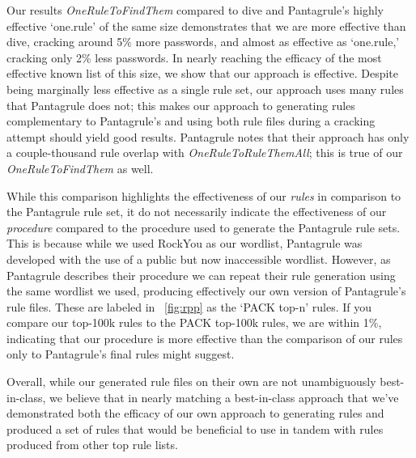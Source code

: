 \documentclass[letterpaper,twocolumn,10pt]{article}
\begin{document}
Our results \textit{OneRuleToFindThem} compared to dive and Pantagrule's highly
effective `one.rule' of the same size demonstrates that we are
more effective than dive, cracking around 5\% more passwords, and almost as effective
as `one.rule,' cracking only 2\% less passwords. In nearly reaching the efficacy of
the most effective known list of this size, we show that our approach is
effective. Despite being marginally less effective as a single rule set, our approach
uses many rules that Pantagrule does not; this makes our approach to generating
rules complementary to Pantagrule's and using both rule files during a cracking
attempt should yield good results. Pantagrule notes that their approach has only
a couple-thousand rule overlap with \textit{OneRuleToRuleThemAll}; this is true
of our \textit{OneRuleToFindThem} as well.

While this comparison highlights the effectiveness of our \textit{rules} in
comparison to the Pantagrule rule set, it do not necessarily indicate the
effectiveness of our \textit{procedure} compared to the procedure used to
generate the Pantagrule rule sets. This is because while we used RockYou as our
wordlist, Pantagrule was developed with the use of a public but now
inaccessible wordlist. However, as Pantagrule describes their procedure we can
repeat their rule generation using the same wordlist we used, producing
effectively our own version of Pantagrule's rule files. These are labeled in
~\ref{fig:rpp} as the `PACK top-n' rules. If you compare our top-100k rules
to the PACK top-100k rules, we are within 1\%, indicating that our procedure
is more effective than the comparison of our rules only to Pantagrule's final
rules might suggest.

Overall, while our generated rule files on their own are not unambiguously
best-in-class, we believe that in nearly matching a best-in-class approach
that we've demonstrated both the efficacy of our own approach to generating
rules and produced a set of rules that would be beneficial to use in tandem
with rules produced from other top rule lists.
\end{document}
